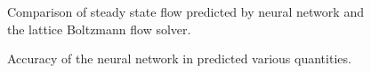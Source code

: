 \documentclass{article} %
\begin{document}
\begin{figure}[!t]
\begin{center}
\end{center}
\caption{Comparison of steady state flow predicted by neural network and the lattice Boltzmann flow solver.}
\label{flow_accuracy}
\end{figure}

\begin{figure}[h]
\begin{center}
\end{center}
\caption{Accuracy of the neural network in predicted various quantities.}
\end{figure}
\end{document}
